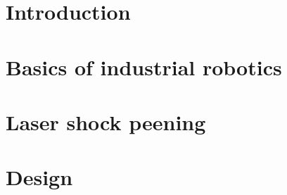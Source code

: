 \documentclass[a4paper,twoside,12pt]{book}
\renewcommand{\chaptermark}[1]{\markboth{#1}{#1}}
\begin{document}






\chapter*{Introduction} %

\pagestyle{fancy}
\renewcommand{\chaptermark}[1]{\markboth{#1}{#1}}
\fancyhead[R]{\chaptername\ \thechapter\ --\ \leftmark}
\fancyhead[L]{}





\mainmatter

\chapter{Basics of industrial robotics}



\chapter{Laser shock peening}

    

\chapter{Design}

    
\end{document}
